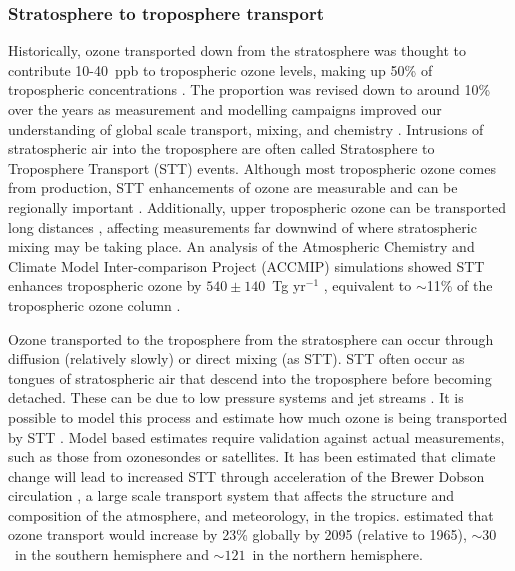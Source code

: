   \subsubsection{Stratosphere to troposphere transport}
    \label{LR:O3:STT}
    Historically, ozone transported down from the stratosphere was thought to contribute 10-40~ppb to tropospheric ozone levels, making up 50\% of tropospheric concentrations \parencite{Atkinson2000, Stohl2003}.
    The proportion was revised down to around 10\% over the years as measurement and modelling campaigns improved our understanding of global scale transport, mixing, and chemistry \parencite{Guenther2006,Monks2015}.
    Intrusions of stratospheric air into the troposphere are often called Stratosphere to Troposphere Transport (STT) events.
    Although most tropospheric ozone comes from production, STT enhancements of 
    ozone are measurable and can be regionally important 
    \parencite[eg.,][]{Jacobson2000,Lelieveld2009,Kuang2017}.
    Additionally, upper tropospheric ozone can be transported long distances 
    \parencite{Cooper2004}, affecting measurements far downwind of where 
    stratospheric mixing may be taking place.
    An analysis of the Atmospheric Chemistry and Climate Model Inter-comparison Project (ACCMIP) simulations showed STT enhances tropospheric ozone by $540\pm140$~Tg yr$^{-1}$ \parencite{Young2013}, equivalent to $\sim$11\% of the tropospheric ozone column \parencite{Monks2015}.
    
    
    Ozone transported to the troposphere from the stratosphere can occur through diffusion (relatively slowly) or direct mixing (as STT).
    STT often occur as tongues of stratospheric air that descend into the troposphere before becoming detached.
    These can be due to low pressure systems and jet streams \parencite{Sprenger2003}.
    It is possible to model this process and estimate how much ozone is being 
    transported by STT \parencite[e.g.,][]{Young2013,Ojha2016}.
    Model based estimates require validation against actual measurements, such as those from ozonesondes or satellites.
    It has been estimated that climate change will lead to increased STT 
    through acceleration of the Brewer Dobson circulation 
    \parencite{Hegglin2009}, a large scale transport system that affects the 
    structure and composition of the atmosphere, and meteorology, in the 
    tropics.
    \textcite{Hegglin2009} estimated that ozone transport would increase by 
    23\% globally by 2095 (relative to 1965), $\sim 30$\tgpyr ~in the southern 
    hemisphere and $\sim 121$\tgpyr ~in the northern hemisphere.
    
